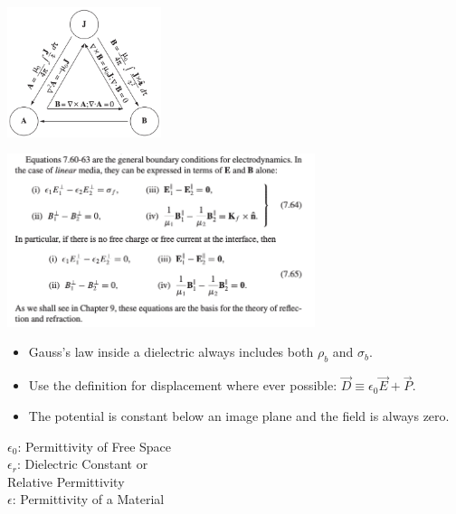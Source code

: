 \documentclass{article}
\newcommand{\formbox}[2]{\begin{center} \begin{tcolorbox}[title = #1, boxrule=2pt,arc=3.4pt,boxsep=0mm] #2\end{tcolorbox}\end{center}}
\begin{document}
\begin{multicols*}{2}
{\begin{center}
            \includegraphics[height=3.8cm]{magnetic-triangle.png}
        \end{center}
    }
    \formbox{More Boundary Conditions}{
        \begin{center}
            \includegraphics[width=9cm]{boundary-conditions.png}
        \end{center}
    }
    \formbox{Takeaways from Practice}{
        \begin{itemize}
            \item Gauss's law inside a dielectric always includes both $\rho_b$ and $\sigma_b$.
            \item Use the definition for displacement where ever possible: $\vec{D} \equiv \epsilon_0 \vec{E} + \vec{P}$.
            \item The potential is constant below an image plane and the field is always zero. 
        \end{itemize}
    }
    \formbox{Names of Stuff}{
        $\epsilon_0$: Permittivity of Free Space\\
        $\epsilon_r$: Dielectric Constant or \\
        \hspace{0.5cm}Relative Permittivity\\
        $\epsilon$: Permittivity of a Material
    }
    
\end{multicols*}
\end{document}
